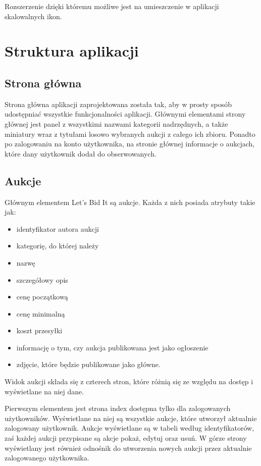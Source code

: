 \documentclass[brudnopis]{xmgr}
\begin{document}
Rozszerzenie dzięki któremu możliwe jest na umieszczenie w aplikacji skalowalnych ikon.

\newpage

\section{Struktura aplikacji}

\subsection{Strona główna}

Strona główna aplikacji zaprojektowana została tak, aby w prosty sposób udostępniać wszystkie funkcjonalności aplikacji. Głównymi elementami strony głównej jest panel z wszystkimi nazwami kategorii nadrzędnych, a także miniatury wraz z tytułami losowo wybranych aukcji z całego ich zbioru. Ponadto po zalogowaniu na konto użytkownika, na stronie głównej informacje o aukcjach, które dany użytkownik dodał do obserwowanych.

\subsection{Aukcje}

Głównym elementem Let's Bid It są aukcje. Każda z nich posiada atrybuty takie jak:
\begin{itemize}

\item identyfikator autora aukcji
\item kategorię, do której należy
\item nazwę
\item szczegółowy opis
\item cenę początkową
\item cenę minimalną
\item koszt przesyłki
\item informację o tym, czy aukcja publikowana jest jako ogłoszenie
\item zdjęcie, które będzie publikowane jako główne.

\end{itemize}

Widok aukcji składa się z czterech stron, które różnią się ze względu na dostęp i wyświetlane na niej dane.

Pierwszym elementem jest strona index dostępna tylko dla zalogowanych użytkowników. Wyświetlane na niej są wszystkie aukcje, które utworzył aktualnie zalogowany użytkownik. Aukcje wyświetlane są w tabeli według identyfikatorów, zaś każdej aukcji przypisane są akcje pokaż, edytuj oraz usuń. W górze strony wyświetlany jest również odnośnik do utworzenia nowych aukcji przez aktualnie zalogowanego użytkownika.
\end{document}
